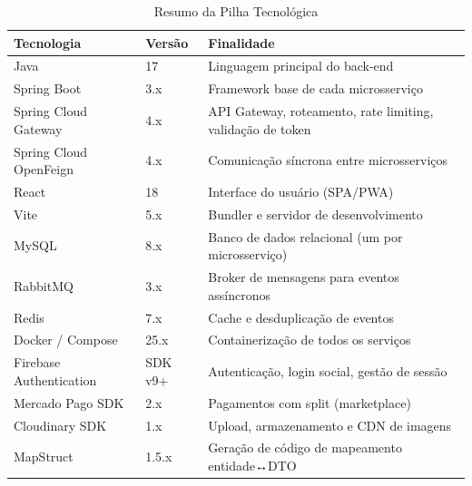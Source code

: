 \documentclass[
    12pt, 
    a4paper, 
    oneside, 
    chapter=TITLE, 
    section=TITLE
]{abntex2}
\begin{document}
\begin{table}[htb]
    \centering
    \caption{Resumo da Pilha Tecnológica}
    \label{tab:techstack}
    \begin{tabular}{llp{6cm}}
        \toprule
        \textbf{Tecnologia} & \textbf{Versão} & \textbf{Finalidade} \\
        \midrule
        Java & 17 & Linguagem principal do back-end \\
        Spring Boot & 3.x & Framework base de cada microsserviço \\
        Spring Cloud Gateway & 4.x & API Gateway, roteamento, rate limiting, validação de token \\
        Spring Cloud OpenFeign & 4.x & Comunicação síncrona entre microsserviços \\
        React & 18 & Interface do usuário (SPA/PWA) \\
        Vite & 5.x & Bundler e servidor de desenvolvimento \\
        MySQL & 8.x & Banco de dados relacional (um por microsserviço) \\
        RabbitMQ & 3.x & Broker de mensagens para eventos assíncronos \\
        Redis & 7.x & Cache e desduplicação de eventos \\
        Docker / Compose & 25.x & Containerização de todos os serviços \\
        Firebase Authentication & SDK v9+ & Autenticação, login social, gestão de sessão \\
        Mercado Pago SDK & 2.x & Pagamentos com split (marketplace) \\
        Cloudinary SDK & 1.x & Upload, armazenamento e CDN de imagens \\
        MapStruct & 1.5.x & Geração de código de mapeamento entidade↔DTO \\
        \bottomrule
    \end{tabular}
\end{table}
\end{document}
